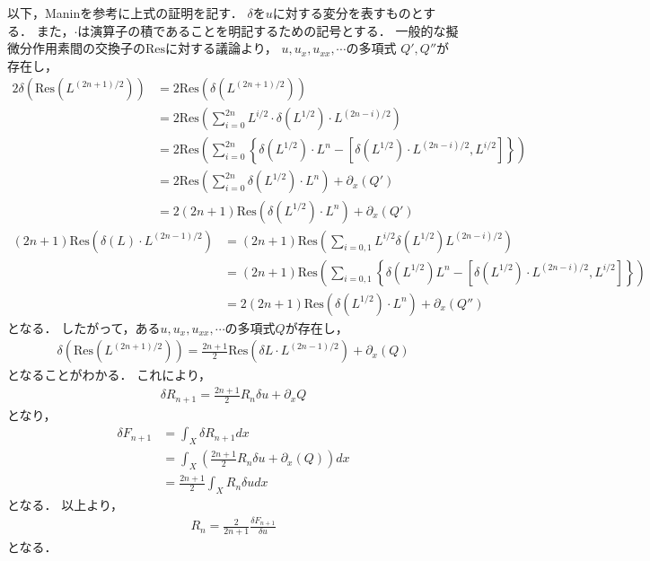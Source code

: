 \documentclass[dvipdfmx,12pt,a4paper,uplatex]{jsarticle}
\theoremstyle{plain}
\theoremstyle{definition}
\begin{document}
以下，Manin\cite{Manin}を参考に上式の証明を記す．
$\delta$を$u$に対する変分を表すものとする．
また，$\cdot$は演算子の積であることを明記するための記号とする．
一般的な擬微分作用素間の交換子の$\mathrm{Res}$に対する議論より，
$u,u_x,u_{xx},\cdots$の多項式
$Q',Q''$が存在し，
\begin{align}
2\delta
\left(
\mathrm{Res}(L^{(2n+1)/2})
\right)
&=
2\mathrm{Res}(\delta(L^{(2n+1)/2})) \nonumber \\
&=
2\mathrm{Res}
\left(
\sum_{i=0}^{2n}L^{i/2}\cdot\delta(L^{1/2})\cdot L^{(2n-i)/2}
\right)
\nonumber \\
&=
2\mathrm{Res}
\left(
\sum_{i=0}^{2n}
\left\{
\delta(L^{1/2})\cdot L^{n} 
- \left[\delta(L^{1/2})\cdot L^{(2n-i)/2}, L^{i/2}\right]
\right\} 
\right)
\nonumber \\
&=
2\mathrm{Res}
\left(
\sum_{i=0}^{2n}
\delta(L^{1/2})\cdot L^{n} 
\right)
+\partial_x(Q') \nonumber \\
&=
2(2n+1)\mathrm{Res}
(
\delta(L^{1/2})\cdot L^{n} 
)
+\partial_x(Q')
\end{align}
\begin{align}
(2n+1)
\mathrm{Res}
\left(
\delta(L)\cdot L^{(2n-1)/2}
\right)
&=
(2n+1)
\mathrm{Res}
\left(
\sum_{i=0,1}L^{i/2}\delta(L^{1/2})L^{(2n-i)/2}
\right) \nonumber \\
&=
(2n+1)
\mathrm{Res}
\left(
\sum_{i=0,1}
\left\{
\delta(L^{1/2})L^{n}
-
\left[\delta(L^{1/2})\cdot L^{(2n-i)/2}, L^{i/2}\right]
\right\}
\right) 
\nonumber \\
&=
2(2n+1)
\mathrm{Res}(\delta(L^{1/2})\cdot L^{n})
+\partial_x(Q'')
\end{align}
となる．
したがって，ある$u,u_x,u_{xx},\cdots$の多項式$Q$が存在し，
\begin{align}
\delta 
\left(
\mathrm{Res}(L^{(2n+1)/2})
\right)
=
\frac{2n+1}{2} \mathrm{Res}(\delta L\cdot L^{(2n-1)/2})
+\partial_x(Q)
\end{align}
となることがわかる．
これにより，
\begin{align}
\delta R_{n+1} 
=
\frac{2n+1}{2} R_{n}\delta u
+\partial_x Q
\end{align}
となり，
\begin{align}
\delta F_{n+1} 
&= \int_X \delta R_{n+1} dx \nonumber\\
&= \int_X 
\left(\frac{2n+1}{2} R_{n}\delta u
+\partial_x (Q) \right)
dx \nonumber\\
&= 
\frac{2n+1}{2}\int_X 
R_{n}\delta u
dx 
\end{align}
となる．
以上より，
\begin{align}
R_n = 
\frac{2}{2n+1}
\frac{\delta F_{n+1}}{\delta u}
\end{align}
となる．
\end{document}
